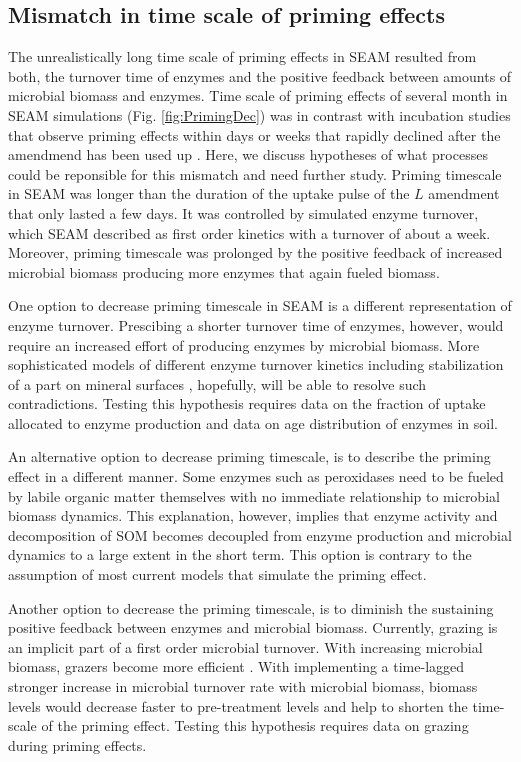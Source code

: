 \subsection{Mismatch in time scale of priming effects}
The unrealistically long time scale of priming effects in SEAM resulted from
both, the turnover time of enzymes and the positive feedback between amounts of
microbial biomass and enzymes. Time scale of priming effects of several month in
SEAM simulations (Fig. \ref{fig:PrimingDec}) was in contrast with incubation
studies that observe priming effects within days or weeks that rapidly
declined after the amendmend has been used up \citep{Blagodatskaya14}. Here, we
discuss hypotheses of what processes could be reponsible for this mismatch and
need further study.
Priming timescale in SEAM was longer than the duration of the uptake pulse of
the $L$ amendment that only lasted a few days. It was controlled by simulated
enzyme turnover, which SEAM described as first order kinetics with a turnover of
about a week. Moreover, priming timescale was prolonged by the
positive feedback of increased microbial biomass producing more enzymes that
again fueled biomass.

One option to decrease priming timescale in SEAM is a different representation
of enzyme turnover. Prescibing a shorter turnover time of enzymes, however,
would require an increased effort of producing enzymes by microbial biomass.
More sophisticated models of different enzyme turnover kinetics including
stabilization of a part on mineral surfaces \citep{Burns13}, hopefully, will be
able to resolve such contradictions. Testing this hypothesis requires data on
the fraction of uptake allocated to enzyme production and data on age distribution
of enzymes in soil.

An alternative option to decrease priming timescale, is to describe the priming
effect in a different manner. Some enzymes such as peroxidases need to be
fueled by labile organic matter themselves \citep{Rousk14} with no immediate relationship
to microbial biomass dynamics. This explanation, however, implies that enzyme
activity and decomposition of SOM becomes decoupled from enzyme production and
microbial dynamics to a large extent in the short term.
This option is contrary to the assumption of most current models that simulate
the priming effect. 

Another option to decrease the priming timescale, is to diminish the sustaining
positive feedback between enzymes and microbial biomass. Currently, grazing is
an implicit part of a first order microbial turnover. With increasing microbial
biomass, grazers become more efficient \citep{Clarholm81}. With implementing a
time-lagged stronger increase in microbial turnover rate with microbial biomass,
biomass levels would decrease faster to pre-treatment levels and help to shorten
the time-scale of the priming effect. Testing this hypothesis requires data on
grazing during priming effects.

